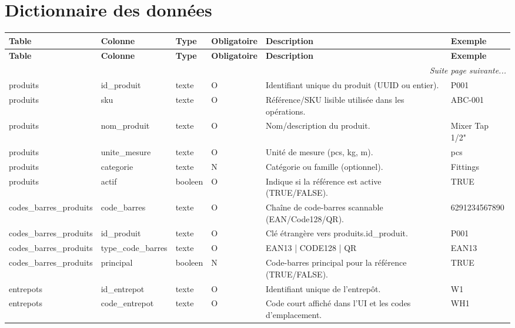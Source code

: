 \documentclass[a4paper,11pt]{article}
\begin{document}
\newpage

\section{Dictionnaire des données}


\scriptsize
\begin{longtable}{|l|l|l|l|l|l|}
\hline
\rowcolor{headerblue}
\textbf{Table} & \textbf{Colonne} & \textbf{Type} & \textbf{Obligatoire} & \textbf{Description} & \textbf{Exemple} \\ \hline
\endfirsthead
\hline
\rowcolor{headerblue}
\textbf{Table} & \textbf{Colonne} & \textbf{Type} & \textbf{Obligatoire} & \textbf{Description} & \textbf{Exemple} \\ \hline
\endhead
\hline \multicolumn{6}{|r|}{\textit{Suite page suivante...}} \\ \hline
\endfoot
\hline
\endlastfoot
 produits & id\_produit & texte & O & Identifiant unique du produit (UUID ou entier). & P001 \\ \hline
\rowcolor{rowgray} produits & sku & texte & O & Référence/SKU lisible utilisée dans les opérations. & ABC-001 \\ \hline
 produits & nom\_produit & texte & O & Nom/description du produit. & Mixer Tap 1/2" \\ \hline
\rowcolor{rowgray} produits & unite\_mesure & texte & O & Unité de mesure (pcs, kg, m). & pcs \\ \hline
 produits & categorie & texte & N & Catégorie ou famille (optionnel). & Fittings \\ \hline
\rowcolor{rowgray} produits & actif & booleen & O & Indique si la référence est active (TRUE/FALSE). & TRUE \\ \hline
 codes\_barres\_produits & code\_barres & texte & O & Chaîne de code-barres scannable (EAN/Code128/QR). & 6291234567890 \\ \hline
\rowcolor{rowgray} codes\_barres\_produits & id\_produit & texte & O & Clé étrangère vers produits.id\_produit. & P001 \\ \hline
 codes\_barres\_produits & type\_code\_barres & texte & O & EAN13 | CODE128 | QR & EAN13 \\ \hline
\rowcolor{rowgray} codes\_barres\_produits & principal & booleen & N & Code-barres principal pour la référence (TRUE/FALSE). & TRUE \\ \hline
 entrepots & id\_entrepot & texte & O & Identifiant unique de l'entrepôt. & W1 \\ \hline
\rowcolor{rowgray} entrepots & code\_entrepot & texte & O & Code court affiché dans l'UI et les codes d'emplacement. & WH1 \\ \hline

\end{longtable}
\end{document}
